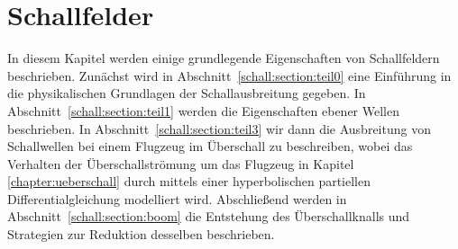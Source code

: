 %
%
%
%
\chapter{Schallfelder\label{chapter:schall}}
\begin{refsection}

\begin{comment}
Ein paar Hinweise für die korrekte Formatierung des Textes
\begin{itemize}
\item
Absätze werden gebildet, indem man eine Leerzeile einfügt.
Die Verwendung von \verb+\\+ ist nur in Tabellen und Arrays gestattet.
\item
Die explizite Platzierung von Bildern ist nicht erlaubt, entsprechende
Optionen werden gelöscht. 
Verwenden Sie Labels und Verweise, um auf Bilder hinzuweisen.
\item
Beginnen Sie jeden Satz auf einer neuen Zeile. 
Damit ermöglichen Sie dem Versionsverwaltungssysteme, Änderungen
in verschiedenen Sätzen von verschiedenen Autoren ohne Konflikt 
anzuwenden.
\item 
Bilden Sie auch für Formeln kurze Zeilen, einerseits der besseren
Übersicht wegen, aber auch um GIT die Arbeit zu erleichtern.
\end{itemize}

\end{comment}

In diesem Kapitel werden einige grundlegende Eigenschaften von
Schallfeldern beschrieben.
Zunächst wird in Abschnitt~\ref{schall:section:teil0} eine Einführung
in die physikalischen Grundlagen der Schallausbreitung gegeben.
In Abschnitt~\ref{schall:section:teil1} werden die Eigenschaften
ebener Wellen beschrieben.
In Abschnitt~\ref{schall:section:teil3} wir dann die Ausbreitung
von Schallwellen bei einem Flugzeug im Überschall zu beschreiben,
wobei das Verhalten der Überschallströmung um das Flugzeug in Kapitel
\ref{chapter:ueberschall} durch mittels einer hyperbolischen
partiellen Differentialgleichung modelliert wird.
Abschließend werden in Abschnitt~\ref{schall:section:boom} die
Entstehung des Überschallknalls und Strategien zur Reduktion desselben
beschrieben.



% 



\printbibliography[heading=subbibliography]
\end{refsection}
